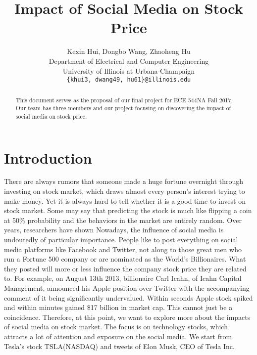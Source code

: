 \documentclass[10pt,twocolumn,letterpaper]{article}
\begin{document}
\title{Impact of Social Media on Stock Price}

\author{Kexin Hui, Dongbo Wang, Zhaoheng Hu\\
Department of Electrical and Computer Engineering\\
University of Illinois at Urbana-Champaign\\
{\tt\small \{khui3, dwang49, hu61\}@illinois.edu}
}

\maketitle

\begin{abstract}
   This document serves as the proposal of our final project for ECE 544NA Fall 2017. Our team has three members and our project focusing on discovering the impact of social media on stock price.
\end{abstract}

\section{Introduction}

There are always rumors that someone made a huge fortune overnight through investing on stock market, which draws almost every person’s interest trying to make money. Yet it is always hard to tell whether it is a good time to invest on stock market. Some may say that predicting the stock is much like flipping a coin at 50\% probability and the behaviors in the market are entirely random. Over years, researchers have shown
Nowadays, the influence of social media is undoutedly of particular importance. People like to post everything on social media platforms like Facebook and Twitter, not along to those great men who run a Fortune 500 company or are nominated as the World’s Billionaires. What they posted will more or less influence the company stock price they are related to. For example, on August 13th 2013, billionaire Carl Icahn, of Icahn Capital Management, announced his Apple position over Twitter with the accompanying comment of it being significantly undervalued. Within seconds Apple stock spiked and within minutes gained \$17 billion in market cap.  This cannot just be a coincidence.
Therefore, at this point, we want to explore more about the impacts of social media on stock market. The focus is on technology stocks, which attracts a lot of attention and exposure on the social media. We start from Tesla’s stock TSLA(NASDAQ) and tweets of Elon Musk, CEO of Tesla Inc.
\end{document}
